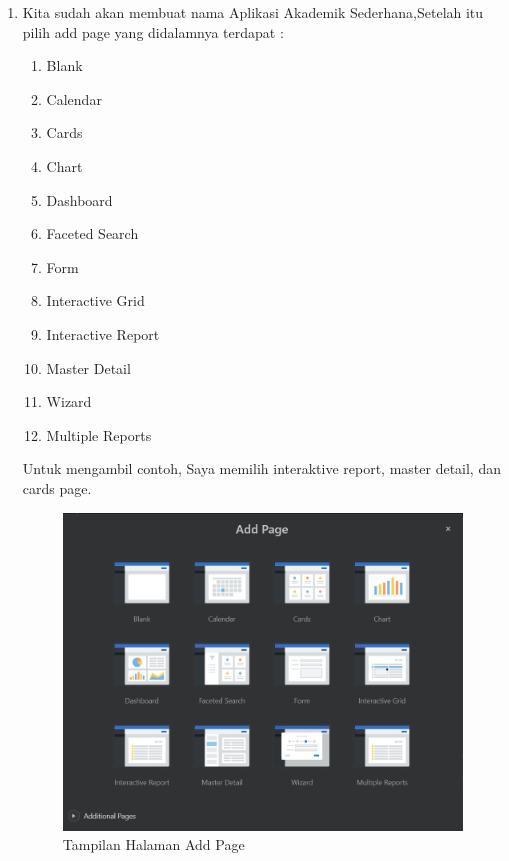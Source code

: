 \begin{enumerate}
\item Kita sudah akan membuat nama Aplikasi Akademik Sederhana,Setelah itu pilih add page yang didalamnya terdapat :
\begin{enumerate}
    \item Blank
    \item Calendar
    \item Cards
    \item Chart
    \item Dashboard
    \item Faceted Search
    \item Form
    \item Interactive Grid
    \item Interactive Report
    \item Master Detail
    \item Wizard
    \item Multiple Reports
\end{enumerate}
Untuk mengambil contoh, Saya memilih interaktive report, master detail, dan cards page.  
    \begin{figure}[!htbp]
    \begin{center}
    \includegraphics[scale=0.6]{section/ica20.JPG}
    \caption{Tampilan Halaman Add Page}
    \end{center}   
    \end{figure} \vspace{8cm}


\end{enumerate}
